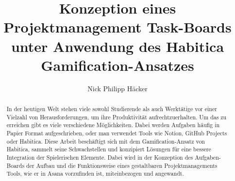 \documentclass[sigconf, nonacm]{acmart}
\begin{document}
\title{Konzeption eines Projektmanagement Task-Boards unter Anwendung des Habitica Gamification-Ansatzes}

\author{Nick Philipp Häcker}




\begin{abstract}
In der heutigen Welt stehen viele sowohl Studierende als auch Werktätige vor einer Vielzahl von Herausforderungen, um ihre Produktivität aufrechtzuerhalten. Um das zu erreichen gibt es viele verschiedene Möglichkeiten. Dabei werden Aufgaben häufig in Papier Format aufgeschrieben, oder man verwendet Tools wie Notion, GitHub Projects oder Habitica. 
Diese Arbeit beschäftigt sich mit dem Gamification-Ansatz von Habitica, sammelt seine Schwachstellen und konzipiert Lösungen für eine bessere Integration der Spielerischen Elemente. Dabei wird in der Konzeption des Aufgaben-Boards der Aufbau und die Funktionsweise eines gestaltbaren Projektmanagements Tools, wie er in Asana vorzufinden ist, miteinbezogen und angewandt.


\end{abstract}
\end{document}
